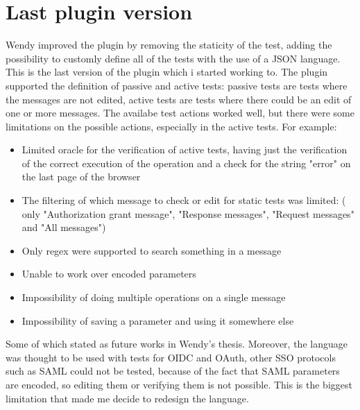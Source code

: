 \section{Last plugin version}
Wendy improved the plugin by removing the staticity of the test, adding the possibility to customly define all of the tests with the use of a JSON language. \\
This is the last version of the plugin which i started working to. The plugin supported the definition of passive and active tests: passive tests are tests where the messages are not edited, active tests are tests where there could be an edit of one or more messages. The availabe test actions worked well, but there were some limitations on the possible actions, especially in the active tests. For example:
\begin{itemize}
    \item Limited oracle for the verification of active tests, having just the verification of the correct execution of the operation and a check for the string "error" on the last page of the browser
    \item The filtering of which message to check or edit for static tests was limited: ( only "Authorization grant message", "Response messages", "Request messages" and "All messages")
    \item Only regex were supported to search something in a message
    \item Unable to work over encoded parameters
    \item Impossibility of doing multiple operations on a single message
    \item Impossibility of saving a parameter and using it somewhere else
\end{itemize}
Some of which stated as future works in Wendy's thesis.
Moreover, the language was thought to be used with tests for OIDC and OAuth, other SSO protocols such as SAML could not be tested, because of the fact that SAML parameters are encoded, so editing them or verifying them is not possible. This is the biggest limitation that made me decide to redesign the language.

